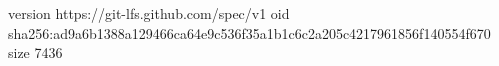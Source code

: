 version https://git-lfs.github.com/spec/v1
oid sha256:ad9a6b1388a129466ca64e9c536f35a1b1c6c2a205c4217961856f140554f670
size 7436
